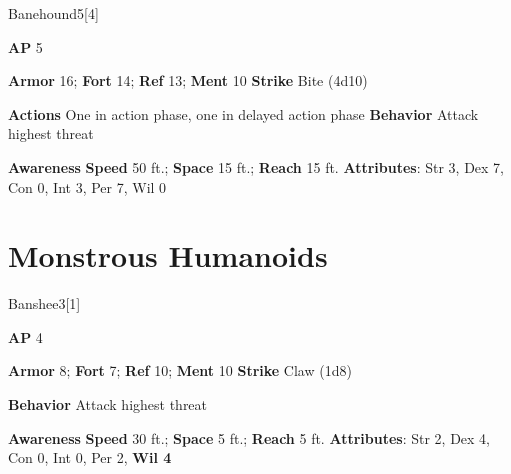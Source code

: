 \begin{monsection}{Banehound}{5}[4]
\vspace{-1em}\vspace{-1em}
\begin{spellcontent}
\begin{spelltargetinginfo}
{\textbf{AP} 5}

\pari \textbf{Armor} 16;
\textbf{Fort} 14;
\textbf{Ref} 13;
\textbf{Ment} 10
\pari \textbf{Strike} Bite  (4d10)


\pari \textbf{Actions} One in action phase, one in delayed action phase
\pari \textbf{Behavior} Attack highest threat
\end{spelltargetinginfo}
\end{spellcontent}

\begin{monsterfooter}
\pari \textbf{Awareness} 
\pari \textbf{Speed} 50 ft.;
\textbf{Space} 15 ft.;
\textbf{Reach} 15 ft.
\pari \textbf{Attributes}:
Str 3,
Dex 7,
Con 0,
Int 3,
Per 7,
Wil 0
\end{monsterfooter}
\end{monsection}

\section{Monstrous Humanoids}
\begin{monsection}{Banshee}{3}[1]
\vspace{-1em}\vspace{-1em}
\begin{spellcontent}
\begin{spelltargetinginfo}
{\textbf{AP} 4}

\pari \textbf{Armor} 8;
\textbf{Fort} 7;
\textbf{Ref} 10;
\textbf{Ment} 10
\pari \textbf{Strike} Claw  (1d8)



\pari \textbf{Behavior} Attack highest threat
\end{spelltargetinginfo}
\end{spellcontent}

\begin{monsterfooter}
\pari \textbf{Awareness} 
\pari \textbf{Speed} 30 ft.;
\textbf{Space} 5 ft.;
\textbf{Reach} 5 ft.
\pari \textbf{Attributes}:
Str 2,
Dex 4,
Con 0,
Int 0,
Per 2,
\textbf{Wil 4}
\end{monsterfooter}
\end{monsection}


